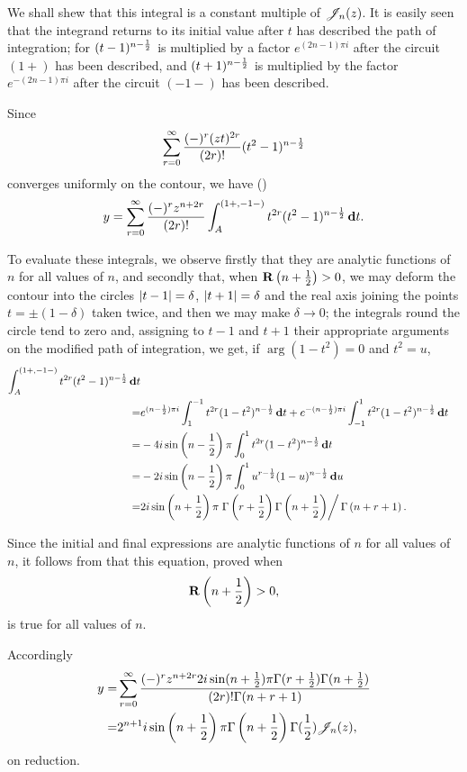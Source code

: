 We shall shew that this integral is a constant multiple of $\mathscr{J}_{n}(z)$.
It is easily seen that the integrand returns to its initial value
after $t$ has described the path of integration; for
$(t-1)^{n-\frac{1}{2}}$ is multiplied by a factor
$e^{(2n-1)\pi i}$ after the circuit $(1+)$ has been described, and
$(t+1)^{n-\frac{1}{2}}$ is multiplied by the factor
$e^{-(2n-1)\pi i}$ after the circuit $(-1-)$ has been described.

Since
$$
\sum_{r=0}^{\infty}
\frac{(-)^{r} (zt)^{2r}}{(2r)!}
(t^{2}-1)^{n-\frac{1}{2}}
$$
converges uniformly on the contour, we have ()
$$
y
=
\sum_{r=0}^{\infty}
\frac{(-)^{r} z^{n+2r}}{(2r)!}
\int_{A}^{(1+,-1-)}
t^{2r}
(t^{2}-1)^{n-\frac{1}{2}}
\, \mathbf{d} t.
$$

To evaluate these integrals, we observe firstly that they are analytic
functions of $n$ for all values of $n$, and secondly that, when
$\operatorname{\mathbf{R}}\left( n+\frac{1}{2} \right) > 0$, we may deform the contour into the
circles $\left| t-1 \right|=\delta$, $\left| t+1 \right|=\delta$ and the real axis
joining the points $t = \pm (1-\delta)$ taken twice, and then we may
make $\delta \rightarrow 0$; the integrals round the circle tend to
zero and, assigning to $t-1$
%
%
and $t+1$ their appropriate arguments on the modified path of
integration, we get, if $\arg (1-t^{2}) = 0$ and $t^{2} = u$,
\begin{align*}
  \int_{A}^{(1+,-1-)}
  t^{2r} (t^{2}-1)^{n-\frac{1}{2}} \, \mathbf{d} t
  \\
  =&
  e^{(n-\frac{1}{2}) \pi i}
  \int_{1}^{-1} t^{2r} (1-t^{2})^{n-\frac{1}{2}} \, \mathbf{d} t
  + e^{-(n-\frac{1}{2}) \pi i}
  \int_{-1}^{1} t^{2r} (1-t^{2})^{n-\frac{1}{2}} \, \mathbf{d} t
  \\
  =&
  -4i
  \sin\left( n-\frac{1}{2} \right)
  \pi
  \int_{0}^{1} t^{2r} (1-t^{2})^{n-\frac{1}{2}} \, \mathbf{d} t
  \\
  =&
  -2i \sin\left( n-\frac{1}{2} \right)
  \pi
  \int_{0}^{1} u^{r-\frac{1}{2}} (1-u)^{n-\frac{1}{2}} \, \mathbf{d} u
  \\
  =&
  2i \sin\left(  n + \frac{1}{2}  \right)
  \pi
  \left.
    \Gamma \left( r + \frac{1}{2} \right)
    \Gamma \left(  n + \frac{1}{2}   \right)
  \right/
  \Gamma \left(  n + r + 1   \right).
\end{align*}

Since the initial and final expressions are analytic functions of $n$
for all values of $n$, it follows from  that this
equation, proved when
$$
\operatorname{\mathbf{R}} \left(  n + \frac{1}{2}  \right) > 0,
$$
is true for all values of $n$.

Accordingly
\begin{align*}
  y
  =&
  \sum_{r=0}^{\infty}
  \frac{(-)^{r} z^{n+2r} 2i \sin(n+\frac{1}{2}) \pi \Gamma(r+\frac{1}{2})
    \Gamma(n+\frac{1}{2})}{ (2r)! \Gamma(n+r+1)}
  \\
  =&
  2^{n+1}
  i
  \sin\left( n+\frac{1}{2} \right)
  \pi
  \Gamma\left( n+\frac{1}{2} \right)
  \Gamma(\frac{1}{2})
  \mathscr{J}_{n}(z),
\end{align*}
on reduction.

